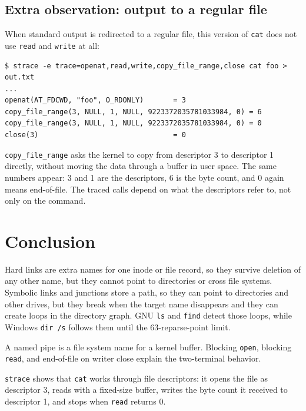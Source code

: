 \documentclass[11pt,a4paper]{article}
\newcommand{\code}[1]{\texttt{#1}}
\begin{document}
\subsection{Extra observation: output to a regular file}

When standard output is redirected to a regular file, this version of
\code{cat} does not use \code{read} and \code{write} at all:

\begin{lstlisting}
$ strace -e trace=openat,read,write,copy_file_range,close cat foo > out.txt
...
openat(AT_FDCWD, "foo", O_RDONLY)       = 3
copy_file_range(3, NULL, 1, NULL, 9223372035781033984, 0) = 6
copy_file_range(3, NULL, 1, NULL, 9223372035781033984, 0) = 0
close(3)                                = 0
\end{lstlisting}

\code{copy\_file\_range} asks the kernel to copy from descriptor 3 to
descriptor 1 directly, without moving the data through a buffer in user space.
The same numbers appear: 3 and 1 are the descriptors, 6 is the byte count, and
0 again means end-of-file. The traced calls depend on what the descriptors
refer to, not only on the command.

\section{Conclusion}

Hard links are extra names for one inode or file record, so they survive
deletion of any other name, but they cannot point to directories or cross file
systems. Symbolic links and junctions store a path, so they can point to
directories and other drives, but they break when the target name disappears
and they can create loops in the directory graph. GNU \code{ls} and
\code{find} detect those loops, while Windows \code{dir /s} follows them until
the 63-reparse-point limit.

A named pipe is a file system name for a kernel buffer. Blocking
\code{open}, blocking \code{read}, and end-of-file on writer close explain the
two-terminal behavior.

\code{strace} shows that \code{cat} works through file descriptors: it opens
the file as descriptor 3, reads with a fixed-size buffer, writes the byte
count it received to descriptor 1, and stops when \code{read} returns 0.
\end{document}
